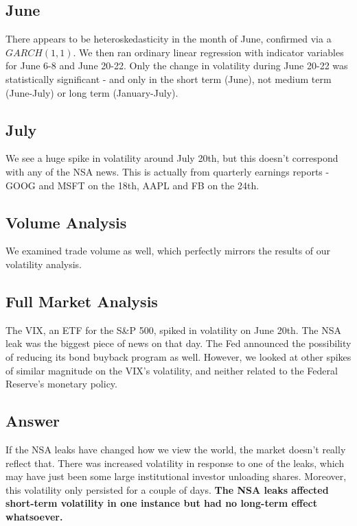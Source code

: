 \documentclass[11pt]{amsart}
\begin{document}
\subsection{June}
There appears to be heteroskedasticity in the month of June, confirmed via a $GARCH(1,1)$. We then ran ordinary linear regression with indicator variables for June 6-8 and June 20-22. Only the change in volatility during June 20-22 was statistically significant - and only in the short term (June), not medium term (June-July) or long term (January-July).

\subsection{July}
We see a huge spike in volatility around July 20th, but this doesn't correspond with any of the NSA news. This is actually from quarterly earnings reports - GOOG and MSFT on the 18th, AAPL and FB on the 24th.

\subsection{Volume Analysis}
We examined trade volume as well, which perfectly mirrors the results of our volatility analysis.

\subsection{Full Market Analysis}
The VIX, an ETF for the S\&P 500, spiked in volatility on June 20th. The NSA leak was the biggest piece of news on that day. The Fed announced the possibility of reducing its bond buyback program as well. However, we looked at other spikes of similar magnitude on the VIX's volatility, and neither related to the Federal Reserve's monetary policy. \\

\subsection{Answer}
If the NSA leaks have changed how we view the world, the market doesn't really reflect that. There was increased volatility in response to one of the leaks, which may have just been some large institutional investor unloading shares. Moreover, this volatility only persisted for a couple of days. \textbf{The NSA leaks affected short-term volatility in one instance but had no long-term effect whatsoever.}
\end{document}
